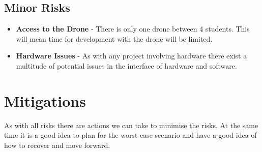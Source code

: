 \documentclass[]{final_report}
\begin{document}
\subsection{Minor Risks}

\begin{itemize}
  \item \textbf{Access to the Drone} - There is only one drone between 4 students. This will mean time for development with the drone will be limited.
  \item \textbf{Hardware Issues} - As with any project involving hardware there exist a multitude of potential issues in the interface of hardware and software.
\end{itemize}

\pagebreak

\section{Mitigations}

As with all risks there are actions we can take to minimise the risks. At the same time it is a good idea to plan for the worst case scenario and have a good idea of how to recover and move forward.
\end{document}
